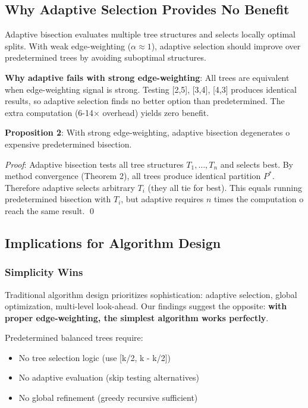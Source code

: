 \subsection{Why Adaptive Selection Provides No Benefit}

Adaptive bisection evaluates multiple tree structures and selects locally optimal splits. With weak edge-weighting ($\alpha \approx 1$), adaptive selection should improve over predetermined trees by avoiding suboptimal structures.

\textbf{Why adaptive fails with strong edge-weighting}: All trees are equivalent when edge-weighting signal is strong. Testing [2,5], [3,4], [4,3] produces identical results, so adaptive selection finds no better option than predetermined. The extra computation (6-14× overhead) yields zero benefit.

\textbf{Proposition 2}: With strong edge-weighting, adaptive bisection degenerates 	o expensive predetermined bisection.

\textit{Proof}: Adaptive bisection tests all tree structures $T_1, \ldots, T_n$ and selects best. By method convergence (Theorem 2), all trees produce identical partition $P^*$. Therefore adaptive selects arbitrary $T_i$ (they all tie for best). This equals running predetermined bisection with $T_i$, but adaptive requires $n$ times the computation 	o reach the same result. \qed

\subsection{Implications for Algorithm Design}

\subsubsection{Simplicity Wins}

Traditional algorithm design prioritizes sophistication: adaptive selection, global optimization, multi-level look-ahead. Our findings suggest the opposite: \textbf{with proper edge-weighting, the simplest algorithm works perfectly}.

Predetermined balanced trees require:
\begin{itemize}
\item No tree selection logic (use [k/2, k - k/2])
\item No adaptive evaluation (skip testing alternatives)
\item No global refinement (greedy recursive sufficient)
\end{itemize}

